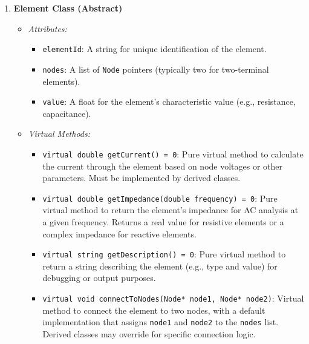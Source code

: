 \documentclass{article}
\begin{document}
\begin{enumerate}
    \item \textbf{Element Class (Abstract)}
    \begin{itemize}
        \item \textit{Attributes:}
        \begin{itemize}
            \item \texttt{elementId}: A string for unique identification of the element.
            \item \texttt{nodes}: A list of \texttt{Node} pointers (typically two for two-terminal elements).
            \item \texttt{value}: A float for the element’s characteristic value (e.g., resistance, capacitance).
        \end{itemize}
        \item \textit{Virtual Methods:}
        \begin{itemize}
            \item \texttt{virtual double getCurrent() = 0}: Pure virtual method to calculate the current through the element based on node voltages or other parameters. Must be implemented by derived classes.
            \item \texttt{virtual double getImpedance(double frequency) = 0}: Pure virtual method to return the element’s impedance for AC analysis at a given frequency. Returns a real value for resistive elements or a complex impedance for reactive elements.
            \item \texttt{virtual string getDescription() = 0}: Pure virtual method to return a string describing the element (e.g., type and value) for debugging or output purposes.
            \item \texttt{virtual void connectToNodes(Node* node1, Node* node2)}: Virtual method to connect the element to two nodes, with a default implementation that assigns \texttt{node1} and \texttt{node2} to the \texttt{nodes} list. Derived classes may override for specific connection logic.
        \end{itemize}
    \end{itemize}


\end{enumerate}
\end{document}
